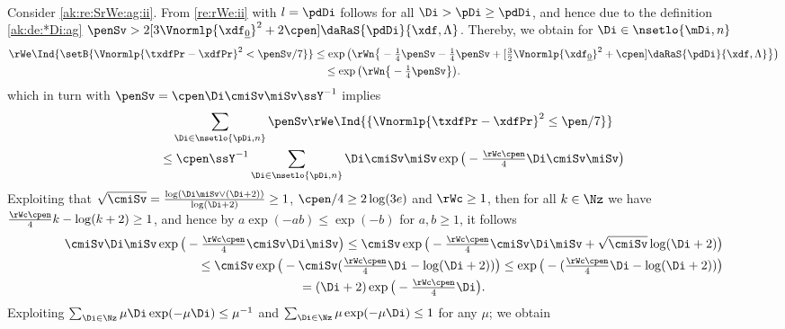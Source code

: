 \begin{pro}
\begin{multline*}
  \end{multline*} 
  Consider \ref{ak:re:SrWe:ag:ii}. From  \ref{re:rWe:ii}
  with $l=\pdDi$ follows for all $\Di>\pDi\geq \pdDi$, and hence due
  to the definition \eqref{ak:de:*Di:ag}
  $\penSv > 2[3\Vnormlp{\xdf_{\underline{0}}}^2+ 2\cpen]\daRaS{\pdDi}{\xdf,\Lambda}$. Thereby, we
  obtain for $\Di\in\nsetlo{\mDi,n}$
  \begin{multline*}
    \rWe\Ind{\setB{\Vnormlp{\txdfPr-\xdfPr}^2<\penSv/7}}
    \leq %
    \exp\big(\rWn\big\{-\tfrac{1}{4} \penSv
    -\tfrac{1}{4}\penSv 
    +[\tfrac{3}{2}\Vnormlp{\xdf_{\underline{0}}}^2+\cpen]\daRaS{\pdDi}{\xdf,\Lambda}\big\}\big)\\
    \leq \exp\big(\rWn\big\{-\tfrac{1}{4} \penSv\big\}\big).
  \end{multline*}
   which in turn with $\penSv=\cpen \Di\cmiSv\miSv \ssY^{-1}$  implies
  \begin{multline}\label{ak:re:SrWe:ag:pe1}
    \sum_{\Di\in\nsetlo{\pDi,n}}\penSv\rWe\Ind{\{\Vnormlp{\txdfPr-\xdfPr}^2\leq\pen/7\}}\\
    \leq \cpen\ssY^{-1}\sum_{\Di\in\nsetlo{\pDi,n}} \Di\cmiSv\miSv\exp\big(-\tfrac{\rWc\cpen}{4}\Di\cmiSv\miSv\big)
  \end{multline}
  Exploiting that
  $\sqrt{\cmiSv}=\tfrac{\log (\Di\miSv \vee
    (\Di+2))}{\log(\Di+2)}\geq1$, $\cpen/4\geq2\log(3e)$ and
  $\rWc\geq1$, then for all $k\in\Nz$ we have
  $\tfrac{\rWc\cpen}{4} k-\log(k+2)\geq1$, and hence by
  $a\exp(-ab)\leq \exp(-b)$ for $a,b\geq1$, it follows
  \begin{multline*}
    \cmiSv\Di \miSv\exp\big(-\tfrac{\rWc\cpen}{4}\cmiSv\Di\miSv\big)
    \leq\cmiSv\exp\big(-\tfrac{\rWc\cpen}{4}\cmiSv\Di\miSv + \sqrt{\cmiSv}\log(\Di+2)\big)
    \\\hfill\leq
    \cmiSv\exp\big(-\cmiSv(\tfrac{\rWc\cpen}{4}\Di-\log(\Di+2))\big)
    \leq\exp\big(-(\tfrac{\rWc\cpen}{4}\Di-\log(\Di+2))\big)\\
    =(\Di+2)\exp\big(-\tfrac{\rWc\cpen}{4}\Di\big).
  \end{multline*}
  Exploiting $\sum_{\Di\in\Nz}\mu\Di\exp(-\mu\Di)\leq \mu^{-1}$ and
  $\sum_{\Di\in\Nz}\mu\exp(-\mu\Di)\leq 1$ for any $\mu$; we obtain
  \begin{displaymath}

\end{displaymath}
\end{pro}
